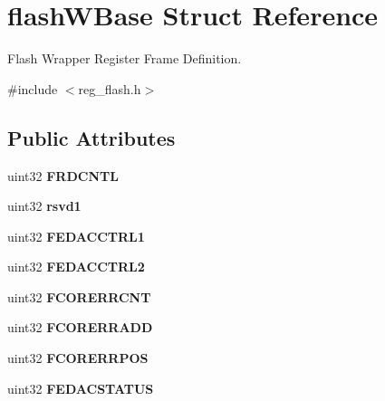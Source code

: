 \hypertarget{structflashWBase}{}\section{flash\+W\+Base Struct Reference}
\label{structflashWBase}


Flash Wrapper Register Frame Definition.  




{\ttfamily \#include $<$reg\+\_\+flash.\+h$>$}

\subsection*{Public Attributes}
\begin{DoxyCompactItemize}
\item 
\mbox{\label{structflashWBase_ad13029d3d2cabc876b38f440cb601ace}} 
uint32 {\bfseries F\+R\+D\+C\+N\+TL}
\item 
\mbox{\label{structflashWBase_ae606d3266c1b535078aeaf4414f4d8ed}} 
uint32 {\bfseries rsvd1}
\item 
\mbox{\label{structflashWBase_a7b559ad6d2ea1811c895ed29d68536c1}} 
uint32 {\bfseries F\+E\+D\+A\+C\+C\+T\+R\+L1}
\item 
\mbox{\label{structflashWBase_a0c2734a380e91298ac17a5c6d377cacf}} 
uint32 {\bfseries F\+E\+D\+A\+C\+C\+T\+R\+L2}
\item 
\mbox{\label{structflashWBase_ab4c944320193bc7126b9b59d611f7434}} 
uint32 {\bfseries F\+C\+O\+R\+E\+R\+R\+C\+NT}
\item 
\mbox{\label{structflashWBase_a3e30def0b2900e9373202d2ab4394095}} 
uint32 {\bfseries F\+C\+O\+R\+E\+R\+R\+A\+DD}
\item 
\mbox{\label{structflashWBase_ae3904e9c34ae4f3d6bc6dabcae06efe2}} 
uint32 {\bfseries F\+C\+O\+R\+E\+R\+R\+P\+OS}
\item 
\mbox{\label{structflashWBase_a696fd9eb82f259dd118a6aff7ecf3602}} 
uint32 {\bfseries F\+E\+D\+A\+C\+S\+T\+A\+T\+US}
\item 

\end{DoxyCompactItemize}
